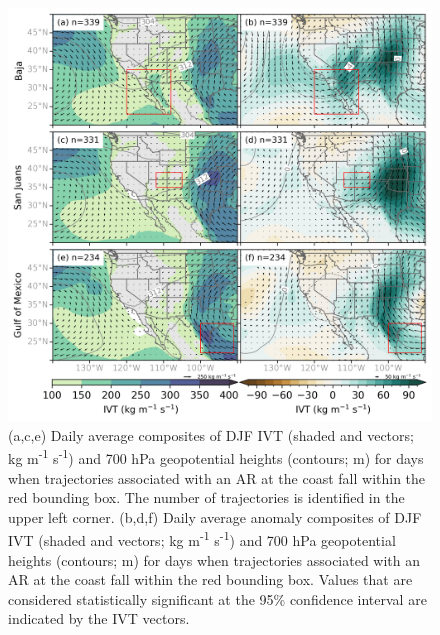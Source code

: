\documentclass[draft,jgrga]{agutexSI2019}
\begin{document}
\begin{figure}
\noindent\includegraphics[width=\textwidth]{figS5.png}
\caption{(a,c,e) Daily average composites of DJF IVT (shaded and vectors; kg m\textsuperscript{-1} s\textsuperscript{-1}) and 700 hPa geopotential heights (contours; m) for days when trajectories associated with an AR at the coast fall within the red bounding box. The number of trajectories is identified in the upper left corner. (b,d,f) Daily average anomaly composites of DJF IVT (shaded and vectors; kg m\textsuperscript{-1} s\textsuperscript{-1}) and 700 hPa geopotential heights (contours; m) for days when trajectories associated with an AR at the coast fall within the red bounding box. Values that are considered statistically significant at the 95\% confidence interval are indicated by the IVT vectors.}
\label{fig:supp:composites_DJF}
\end{figure}
\end{document}

